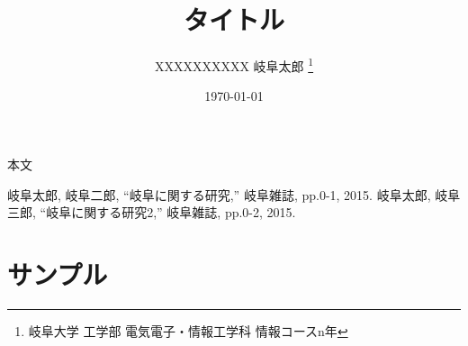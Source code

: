 \documentclass[10pt, a4j]{jsarticle}
\title{タイトル}
\author{XXXXXXXXXX 岐阜太郎 \thanks{岐阜大学 工学部 電気電子・情報工学科 情報コースn年}}
\date{\today}
\def\linesparpage#1{\baselineskip=\textheight
   \divide\baselineskip by #1}
\begin{document}
%
\maketitle
%
本文
%
\begin{thebibliography}{9}
     岐阜太郎, 岐阜二郎, ``岐阜に関する研究,'' 岐阜雑誌, pp.0-1, 2015.
     岐阜太郎, 岐阜三郎, ``岐阜に関する研究2,'' 岐阜雑誌, pp.0-2, 2015.
\end{thebibliography}
%
\appendix
\section{サンプル}

%
\end{document}
